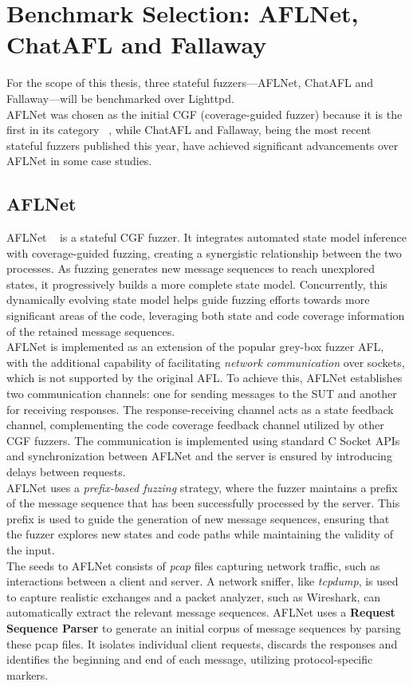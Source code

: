 \section{Benchmark Selection: AFLNet, ChatAFL and Fallaway}

For the scope of this thesis, three stateful fuzzers—AFLNet, ChatAFL and Fallaway—will be benchmarked over Lighttpd.
\\AFLNet was chosen as the initial CGF (coverage-guided fuzzer) because it is the first in its category ~\cite{AFLNet}, while ChatAFL and Fallaway, being the most recent stateful fuzzers published this year, have achieved significant advancements over AFLNet in some case studies.
 
\subsection{AFLNet}
AFLNet ~\cite{AFLNet} is a stateful CGF fuzzer. It integrates automated state model inference with coverage-guided fuzzing, creating a synergistic relationship between the two processes. As fuzzing generates new message sequences to reach unexplored states, it progressively builds a more complete state model. Concurrently, this dynamically evolving state model helps guide fuzzing efforts towards more significant areas of the code, leveraging both state and code coverage information of the retained message sequences.
\\AFLNet is implemented as an extension of the popular grey-box fuzzer AFL, with the additional capability of facilitating \textit{network communication} over sockets, which is not supported by the original AFL. To achieve this, AFLNet establishes two communication channels: one for sending messages to the SUT and another for receiving responses. The response-receiving channel acts as a state feedback channel, complementing the code coverage feedback channel utilized by other CGF fuzzers. The communication is implemented using standard C Socket APIs and synchronization between AFLNet and the server is ensured by introducing delays between requests.
\\AFLNet uses a \textit{prefix-based fuzzing} strategy, where the fuzzer maintains a prefix of the message sequence that has been successfully processed by the server. This prefix is used to guide the generation of new message sequences, ensuring that the fuzzer explores new states and code paths while maintaining the validity of the input.
\\The seeds to AFLNet consists of \textit{pcap} files capturing network traffic, such as interactions between a client and server. A network sniffer, like \textit{tcpdump}, is used to capture realistic exchanges and a packet analyzer, such as Wireshark, can automatically extract the relevant message sequences. AFLNet uses a \textbf{Request Sequence Parser} to generate an initial corpus of message sequences by parsing these pcap files. It isolates individual client requests, discards the responses and identifies the beginning and end of each message, utilizing protocol-specific markers.

